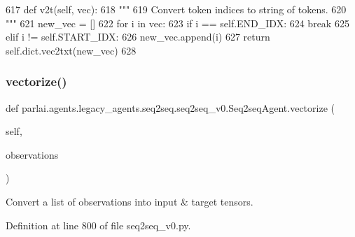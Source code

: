 \begin{DoxyCode}
617     \textcolor{keyword}{def }v2t(self, vec):
618         \textcolor{stringliteral}{"""}
619 \textcolor{stringliteral}{        Convert token indices to string of tokens.}
620 \textcolor{stringliteral}{        """}
621         new\_vec = []
622         \textcolor{keywordflow}{for} i \textcolor{keywordflow}{in} vec:
623             \textcolor{keywordflow}{if} i == self.END\_IDX:
624                 \textcolor{keywordflow}{break}
625             \textcolor{keywordflow}{elif} i != self.START\_IDX:
626                 new\_vec.append(i)
627         \textcolor{keywordflow}{return} self.dict.vec2txt(new\_vec)
628 
\end{DoxyCode}
\mbox{\label{classparlai_1_1agents_1_1legacy__agents_1_1seq2seq_1_1seq2seq__v0_1_1Seq2seqAgent_a83e2433e00bff6162ebad3b818771b59}} 
\subsubsection{\texorpdfstring{vectorize()}{vectorize()}}
{\footnotesize\ttfamily def parlai.\+agents.\+legacy\+\_\+agents.\+seq2seq.\+seq2seq\+\_\+v0.\+Seq2seq\+Agent.\+vectorize (\begin{DoxyParamCaption}\item[{}]{self,  }\item[{}]{observations }\end{DoxyParamCaption})}

\begin{DoxyVerb}Convert a list of observations into input & target tensors.
\end{DoxyVerb}
 

Definition at line 800 of file seq2seq\+\_\+v0.\+py.


